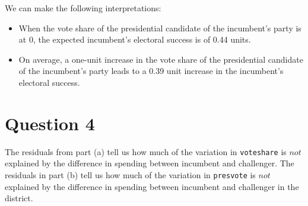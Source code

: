 \documentclass[12pt,letterpaper]{article}
\begin{document}
\begin{enumerate}
		We can make the following interpretations:
		\begin{itemize}
			\item When the vote share of the presidential candidate of the incumbent's party is at 0, the expected incumbent's electoral success is of 0.44 units.
			\item On average, a one-unit increase in the vote share of the presidential candidate of the incumbent's party leads to a 0.39 unit increase in the incumbent's electoral success.
		\end{itemize}	
	\end{enumerate}
	

\newpage	
\section*{Question 4}
\noindent The residuals from part (a) tell us how much of the variation in \texttt{voteshare} is $not$ explained by the difference in spending between incumbent and challenger. The residuals in part (b) tell us how much of the variation in \texttt{presvote} is $not$ explained by the difference in spending between incumbent and challenger in the district.
\end{document}
